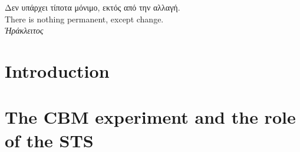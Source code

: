 \newcommand{\myStringStyle}[1]{{\footnotesize\sffamily\color{violet!100!black} #1}}
 
\newcommand{\mySymbolStyle}[1]{{\footnotesize\sffamily\color{violet!100!black} #1}}
 
\newcommand{\myKeywordStyle}[1]{{\footnotesize\sffamily\color{green!70!black} #1}}
 
\newcommand{\myGlobalStyle}[1]{{\footnotesize\sffamily\color{blue!100!black} #1}}
 
\newcommand{\myNumberStyle}[1]{{\footnotesize\sffamily\color{brown!100!black} #1}}











\thispagestyle{empty}
\clearpage
\begin{center}

\hspace{0pt}
\vfill

\Large\foreignlanguage{greek}{Δεν υπάρχει τίποτα μόνιμο, εκτός από την αλλαγή.\\}
\vspace{0.5cm}
\normalsize{There is nothing permanent, except change.\\}
\vspace{1cm}
\color{auburn}\foreignlanguage{greek}{\textit{Ἡράκλειτος}}
\vfill
\hspace{0pt}
\end{center}
\pagebreak
%
\chapter{Introduction}
\label{chap:intro}

\chapter{The CBM experiment and the role of the STS}
\label{chap:CBM_STS}



